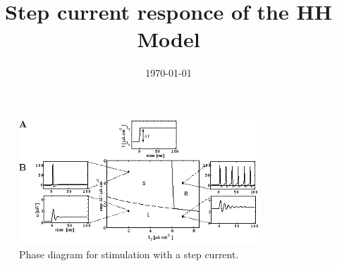 \documentclass{beamer}
\title[A constant current applied to the HH model produces a train of action potentials.]{Step current responce of the HH Model}
\author[E.Ioannidis \& J.Hobin] {
   \texorpdfstring{
        \begin{columns}
            \column{.45\linewidth}
            \centering
            Eleftherios Ioannidis\\
            \href{mailto:elefthei@mit.edu}{elefthei@mit.edu}
            \column{.45\linewidth}
            \centering
            James Hobin\\
            \href{mailto:hobinjk@mit.edu}{hobinjk@mit.edu}
        \end{columns}
   }
   {Eleftherios Ioannidis \& James Hobin}
}
\institute{MIT EECS}
\date{\today}
\begin{document}
\begin{frame}
  \titlepage
\end{frame}

\begin{frame}
  \begin{figure}
    \centering
    \includegraphics[width = 0.8\textwidth]{./pictures/gerstner.png}
    \caption{Phase diagram for stimulation with a step current.}
  \end{figure}
\end{frame}

\begin{frame}

\end{frame}
\end{document}
